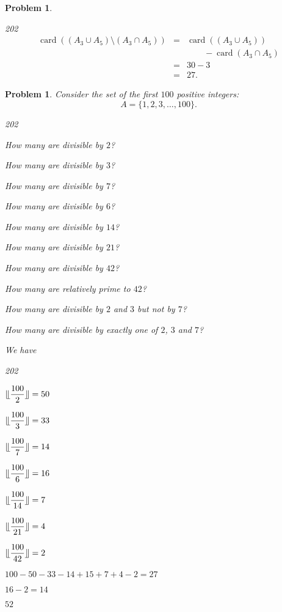 \documentclass[11pt, openany]{book}
\theoremstyle{change} \theoremheaderfont{\blue\sffamily\bfseries}
\newtheorem{pro}[thm]{Problem}
\theoremstyle{nonumberplain} \theoremheaderfont{\sffamily\bfseries}
\newcommand{\í}{\'{\i}}
\def\card#1{\operatorname{card}\left(#1\right)}
\def\floor#1{\llfloor #1 \rrfloor}
\begin{document}
\begin{multicols}{2}
\begin{pro}
\begin{answer}
\begin{dingautolist}{202}
$$\begin{array}{lll}\card{(A_3 \cup A_5) \setminus (A_3 \cap A_5)}
& =  & \card{(A_3 \cup A_5)} \\
& & \qquad - \card{A_3 \cap A_5}\\ &  = &  30 - 3
\\ & = &  27.\end{array}$$
\end{dingautolist}
\end{answer}
\end{pro}
\begin{pro}
Consider the set of the first $100$ positive integers: $$ A =
\{1,2,3,\ldots , 100\}.$$  \begin{dingautolist}{202}\item  How many
are divisible by $2$? \item  How many are divisible by $3$?
\item How many are divisible by $7$? \item  How many are divisible
by $6$?  \item  How many are divisible by $14$? \item  How many are
divisible by $21$? \item How many are divisible by $42$? \item
 How many are relatively prime to $42$?
 \item How many are divisible by $2$ and $3$ but not by $7$?
  \item How many are divisible by  exactly one of $2$, $3$ and $7$?
\end{dingautolist}
\begin{answer}
We have
\begin{dingautolist}{202}\item $\floor{\dfrac{100}{2}} = 50$
\item $\floor{\dfrac{100}{3}} = 33$ \item  $\floor{\dfrac{100}{7}} = 14$ \item  $\floor{\dfrac{100}{6}} = 16
$   \item  $\floor{\dfrac{100}{14}} = 7$  \item
$\floor{\dfrac{100}{21}} = 4$
\item $\floor{\dfrac{100}{42}} = 2$  \item
$100-50-33-14+15+7+4-2 = 27$
 \item $16-2=14$
  \item $ 52$
\end{dingautolist}
\end{answer}

\end{pro}
\end{multicols}
\end{document}
